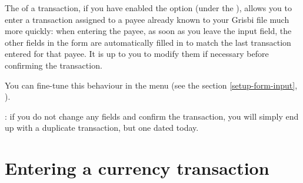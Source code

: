 The  of a transaction, if you have enabled the  option (under the ), allows you to enter a transaction assigned to a payee already known to your Grisbi file much more quickly: when entering the payee, as soon as you leave the input field, the other fields in the form are automatically filled in to match the last transaction entered for that payee. It is up to you to modify them if necessary before confirming the transaction.

You can fine-tune this behaviour in the  menu (see the section \vref{setup-form-input}, ).

\Note{}: if you do not change any fields and confirm the transaction, you will simply end up with a duplicate transaction, but one dated today.


\section{Entering a currency transaction\label{transactions-currencies}}

